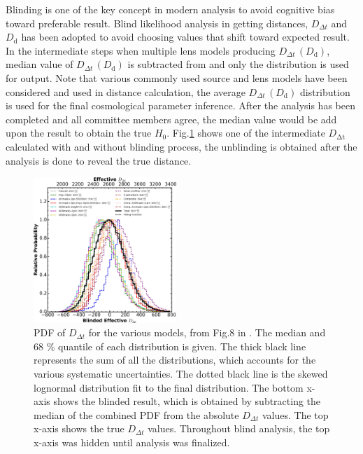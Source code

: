 \documentclass{cosmo}
\begin{document}
    Blinding is one of the key concept in modern analysis to avoid cognitive bias toward preferable result. Blind likelihood analysis in getting distances, $D_{\Delta t}$ and $D_\mathrm{d}$ has been adopted to avoid choosing values that shift toward expected result. In the intermediate steps when multiple lens models producing $D_{\Delta t} \,(D_\mathrm{d})$, median value of $D_{\Delta t}\,(D_\mathrm{d})$ is subtracted from and only the distribution is used for output. Note that various commonly used source and lens models have been considered and used in distance calculation, the average $D_{\Delta t}\,(D_\mathrm{d})$ distribution is used for the final cosmological parameter inference. After the analysis has been completed and all committee members agree, the median value would be add upon the result to obtain the true $H_\mathrm{0}$. Fig.\ref{fig6} shows one of the intermediate $D_\mathrm{\Delta t}$ calculated with and without blinding process, the unblinding is obtained after the analysis is done to reveal the true distance. 
    \begin{figure}[h]
        \centering
        \includegraphics[width=0.48\textwidth]{fig6_2.png}
        \caption{PDF of $D_{\Delta t}$ for the various models, from Fig.8 in \cite{Wong2016}. The median and 68 $\%$ quantile of each distribution is given. The thick black line represents the sum of all the distributions, which accounts for the various systematic uncertainties. The dotted black line is the skewed lognormal distribution fit to the final distribution. The bottom x-axis shows the blinded result, which is obtained by subtracting the median of the combined PDF from the absolute $D_{\Delta t}$ values. The top x-axis shows the true $D_{\Delta t}$ values. Throughout blind analysis, the top x-axis was hidden until analysis was finalized.}
        \label{fig6}
    \end{figure}
\end{document}

